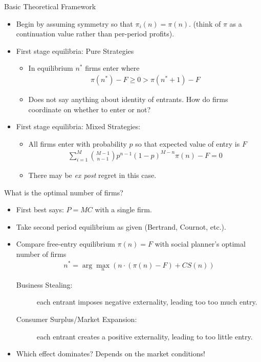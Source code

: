 \documentclass[xcolor=pdftex,dvipsnames,table,mathserif]{beamer}
\begin{document}
\begin{frame}{Basic Theoretical Framework}
\begin{itemize}
\item Begin by assuming symmetry so that $\pi_i(n) = \pi(n)$. (think of $\pi$ as a continuation value rather than per-period profits).
\item First stage equilibria: Pure Strategies
\begin{itemize}
\item In equilibrium $n^*$ firms enter where 
\begin{eqnarray*}
\pi(n^*)  - F \geq 0 > \pi(n^* +1) -F
\end{eqnarray*}
\item Does not say anything about identity of entrants. How do firms coordinate on whether to enter or not?
\end{itemize}
\item First stage equilibria: Mixed Strategies:
\begin{itemize}
\item All firms enter with probability $p$ so that expected value of entry is $F$
\begin{eqnarray*}
\sum_{i=1}^M {{M-1}\choose{n-1}} p^{n-1} (1-p)^{M-n} \pi(n) - F = 0
\end{eqnarray*}
\item There may be \textit{ex post} regret in this case.
\end{itemize}
\end{itemize}
\end{frame} 

\begin{frame}{What is the optimal number of firms?}
\begin{itemize}
\item First best says: $P=MC$ with a single firm.
\item Take second period equilibrium as given (Bertrand, Cournot, etc.).
\item Compare free-entry equilibrium $\pi(n) =F$ with social planner's optimal number of firms
\begin{eqnarray*}
n^* = \arg \max_n \left (n \cdot (\pi(n) - F)  + CS(n) \right)
\end{eqnarray*}
\begin{description}
\item[Business Stealing:] each entrant imposes \alert{negative} externality, leading too too much entry.
\item[Consumer Surplus/Market Expansion:] each entrant creates a \alert{positive} externality, leading to too little entry.
\end{description}
\item Which effect dominates? Depends on the market conditions!
\end{itemize}
\end{frame} 
\end{document}
